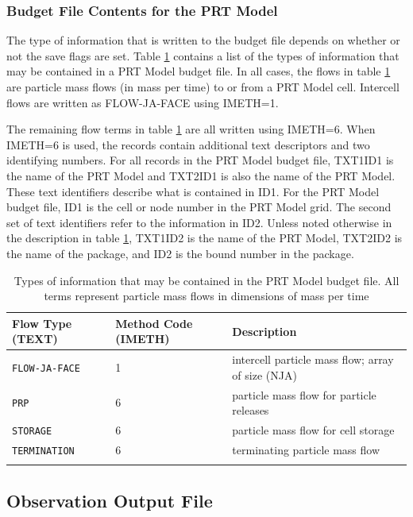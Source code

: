 \newpage
\subsubsection{Budget File Contents for the PRT Model}

The type of information that is written to the budget file depends on whether or not the save flags are set.  Table \ref{table:prtbud} contains a list of the types of information that may be contained in a PRT Model budget file.  In all cases, the flows in table \ref{table:prtbud} are particle mass flows (in mass per time) to or from a PRT Model cell.  Intercell flows are written as FLOW-JA-FACE using IMETH=1.

The remaining flow terms in table \ref{table:prtbud} are all written using IMETH=6.  When IMETH=6 is used, the records contain additional text descriptors and two identifying numbers.  For all records in the PRT Model budget file, TXT1ID1 is the name of the PRT Model and TXT2ID1 is also the name of the PRT Model.  These text identifiers describe what is contained in ID1.  For the PRT Model budget file, ID1 is the cell or node number in the PRT Model grid.  The second set of text identifiers refer to the information in ID2.  Unless noted otherwise in the description in table \ref{table:prtbud}, TXT1ID2 is the name of the PRT Model, TXT2ID2 is the name of the package, and ID2 is the bound number in the package.

\begin{longtable}{p{3.5cm} p{2cm} p{9cm}}
\caption{Types of information that may be contained in the PRT Model budget file.  All terms represent particle mass flows in dimensions of mass per time} 
\tabularnewline
\hline
\textbf{Flow Type (TEXT)} & \textbf{Method Code (IMETH)} & \textbf{Description} \\
\hline
\endhead
\hline
\endfoot
\texttt{FLOW-JA-FACE} & 1 & intercell particle mass flow; array of size (NJA) \\
\texttt{PRP} & 6 & particle mass flow for particle releases \\
\texttt{STORAGE} & 6 & particle mass flow for cell storage \\
\texttt{TERMINATION} & 6 & terminating particle mass flow \\
\label{table:prtbud}
\end{longtable}


\newpage
\subsection{Observation Output File}

